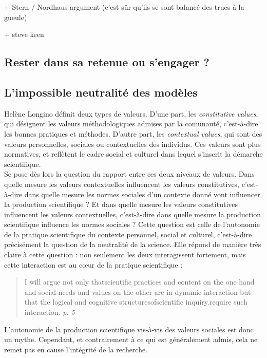 + Stern / Nordhaus argument (c'est sûr qu'ils se sont balancé des trucs à la gueule) 

+ steve keen \cite{keen_appallingly_2021}

\subsection{Rester dans sa retenue ou s'engager ?}

\subsection{L'impossible neutralité des modèles}

Helène Longino définit deux types de valeurs. D'une part, les \emph{constitutive values}, qui désignent les valeurs méthodologiques admises par la comunauté, c'est-à-dire les bonnes pratiques et méthodes. D'autre part, les \emph{contextual values}, qui sont des valeurs personnelles, sociales ou contextuelles des individus. Ces valeurs sont plus normatives, et reflètent le cadre social et culturel dans lequel s'inscrit la démarche scientifique. \\

Se pose dès lors la question du rapport entre ces deux niveaux de valeurs. Dans quelle mesure les valeurs contextuelles influencent les valeurs constitutives, c'est-à-dire dans quelle mesure les normes sociales d'un contexte donné vont influencer la production scientifique ? Et dans quelle mesure les valeurs constitutives influencent les valeurs contextuelles, c'est-à-dire dans quelle mesure la production scientifique influence les normes sociales ? Cette question est celle de l'autonomie de la pratique scientifique du contexte personnel, social et culturel, c'est-à-dire précisément la question de la neutralité de la science. Elle répond de manière très claire à cette question : non seulement les deux interagissent fortement, mais cette interaction est au cœur de la pratique scientifique : 

\begin{quote}
    I will argue not only thatscientific practices and content on the one hand and social needs and values on the other are in dynamic interaction but that the logical and cognitive structuresofscientific inquiry.require such interaction. \textit{p. 5}
\end{quote}

L'autonomie de la production scientifique vis-à-vis des valeurs sociales est donc un mythe. Cependant, et contrairement à ce qui est généralement admis, cela ne remet pas en cause l'intégrité de la recherche. 

